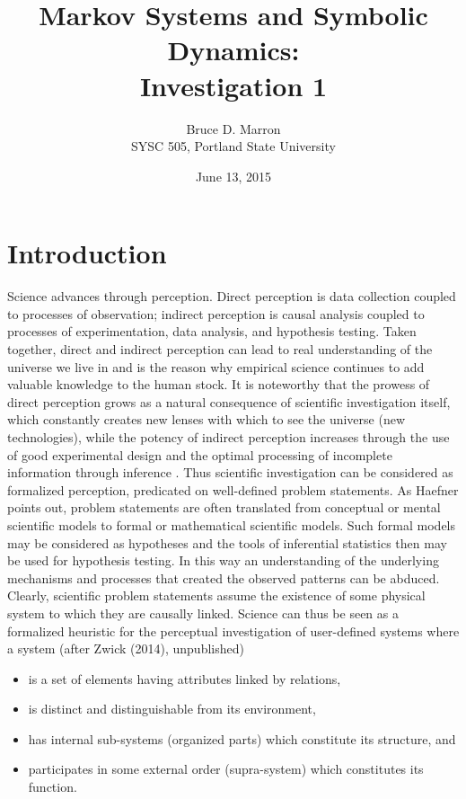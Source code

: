 \documentclass[letter,11pt]{article}
\title{Markov Systems and Symbolic Dynamics:\\
Investigation 1}
\date{June 13, 2015}
\author{Bruce D. Marron\\
SYSC 505, Portland State University}
\begin{document}
\maketitle
\setcounter{secnumdepth}{0}


\section{Introduction}
Science advances through perception. Direct perception is data collection coupled to processes of observation; indirect perception is causal analysis coupled to processes of experimentation, data analysis, and hypothesis testing.  Taken together, direct and indirect perception can lead to real understanding of the universe we live in and is the reason why empirical science continues to add valuable knowledge to the human stock. It is noteworthy that the prowess of direct perception grows as a natural consequence of scientific investigation itself, which constantly creates new lenses with which to see the universe (new technologies), while the potency of indirect perception increases through the use of good experimental design and the optimal processing of incomplete information through inference \cite{jaynes_probability_2003}. Thus scientific investigation can be considered as formalized perception, predicated on well-defined problem statements. As Haefner \cite{haefner_modeling_2005} points out, problem statements are often translated from conceptual or mental scientific models to formal or mathematical scientific models. Such formal models may be considered as hypotheses and the tools of inferential statistics then may be used for hypothesis testing. In this way an understanding of the underlying mechanisms and processes that created the observed patterns can be abduced. Clearly, scientific problem statements assume the existence of some physical system to which they are causally linked. Science can thus be seen as a formalized heuristic for the perceptual investigation of user-defined systems where a system (after Zwick (2014), unpublished)
\begin{itemize}
  \item is a set of elements having attributes linked by relations,
  \item is distinct and distinguishable from its environment,
  \item has internal sub-systems (organized parts) which constitute its structure, and
  \item participates in some external order (supra-system) which constitutes its function.
\end{itemize}
\end{document}
